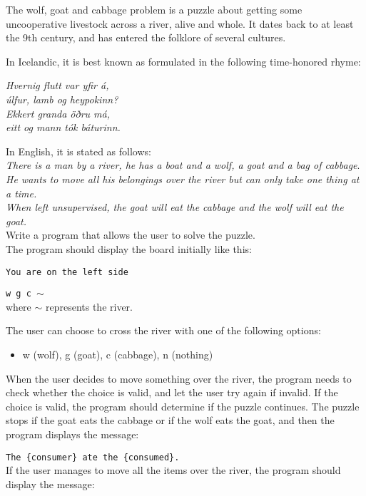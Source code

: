 
The wolf, goat and cabbage problem is a puzzle about getting some uncooperative livestock across a river, alive and whole.
It dates back to at least the 9th century, and has entered the folklore of several cultures.

In Icelandic, it is best known as formulated in the following time-honored rhyme:\\
\begin{center}
    \emph{Hvernig flutt var yfir á,}\\
    \emph{úlfur, lamb og heypokinn?}\\
    \emph{Ekkert granda öðru má,}\\
    \emph{eitt og mann tók báturinn.}\\
\end{center}

In English, it is stated as follows:\\
   \emph{There is a man by a river, he has a boat and a wolf, a goat and a bag of cabbage}.\\
   \emph{He wants to move all his belongings over the river but can only take one thing at a time.}\\
   \emph{When left unsupervised, the goat will eat the cabbage and the wolf will eat the goat.}\\

Write a program that allows the user to solve the puzzle.\\
The program should display the board initially like this:

\texttt{You are on the left side}

\texttt{w g c $\sim$}\\
where $\sim$ represents the river.

The user can choose to cross the river with one of the following options:
\begin{itemize}
    \item w (wolf), g (goat), c (cabbage), n (nothing)
\end{itemize}
When the user decides to move something over the river,
the program needs to check whether the choice is valid,
and let the user try again if invalid.
If the choice is valid, the program should determine if the puzzle continues.
The puzzle stops if the goat eats the cabbage or if the wolf eats the goat,
and then the program displays the message:

\texttt{The \{consumer\} ate the \{consumed\}.}\\
If the user manages to move all the items over the river,
the program should display the message:

